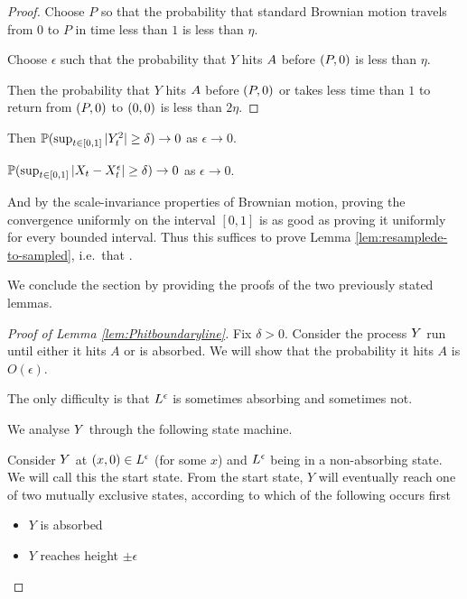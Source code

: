 {\begin{proof}
  Choose $P$ so that the probability that standard Brownian motion
  travels from $0$ to $P$ in time less than $1$ is less than
  $\eta$.

  Choose $\epsilon$ such that the probability that $Y$ hits
  $\boundarylines$ before $\farpoint$ is less than $\eta$.

  Then the probability that $Y$ hits $\boundarylines$ before $\farpoint$
  or takes less time than $1$ to return from $\farpoint$ to $\origin$ is
  less than $2\eta$.
\end{proof}

\begin{lemma}
  Then $\P(\sup_{t \in [0,1]} |Y^2_t| \ge
  \delta) \to 0$ as $\epsilon \to 0$.
\end{lemma}

\begin{cor}
  $\P(\sup_{t \in [0,1]} |\sampled_t - \resamplede_t | \ge \delta) \to
  0$ as $\epsilon \to 0$.
\end{cor}

And by the scale-invariance properties of Brownian motion, proving the
convergence uniformly on the interval $[0,1]$ is as good as proving it
uniformly for every bounded interval.  Thus this suffices to prove
Lemma \ref{lem:resamplede-to-sampled}, i.e.\ that \statementoflemresampledetosampled.

We conclude the section by providing the proofs of the two previously
stated lemmas.

\begin{proof}[Proof of Lemma \ref{lem:Phitboundaryline}]
Fix $\delta > 0$.  Consider the process $\rotproc$ run until either
it hits $A$ or is absorbed.  We will show that the probability it
hits $A$ is $O(\epsilon)$.

The only difficulty is that $\Le$ is sometimes absorbing and
sometimes not.

We analyse $\rotproc$ through the following state machine.

Consider $\rotproc$ at $(x,0) \in \Le$ (for some $x$) and $\Le$ being in
a non-absorbing state.  We will call this the start state.  From the
start state, $Y$ will eventually reach one of two mutually exclusive
states, according to which of the following occurs first

\newcommand{\intermediatelines}{I}

\begin{itemize}
\item $Y$ is absorbed
\item $Y$ reaches height $\pm\epsilon$
\end{itemize}


\end{proof}}
